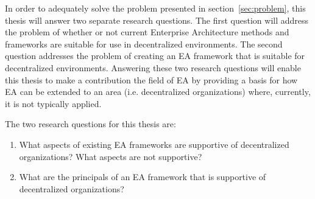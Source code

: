 In order to adequately solve the problem presented in section~\ref{sec:problem}, this thesis will answer two separate research questions. The first question will address the problem of whether or not current Enterprise Architecture methods and frameworks are suitable for use in decentralized environments. The second question addresses the problem of creating an EA framework that is suitable for decentralized environments. Answering these two research questions will enable this thesis to make a contribution the field of EA by providing a basis for how EA can be extended to an area (i.e. decentralized organizations) where, currently, it is not typically applied. 

The two research questions for this thesis are:

\begin{enumerate}
\item What aspects of existing EA frameworks are supportive of decentralized organizations? What aspects are not supportive?
\label{req:1}
\item What are the principals of an EA framework that is supportive of decentralized organizations?
\label{req:2}
\end{enumerate}

